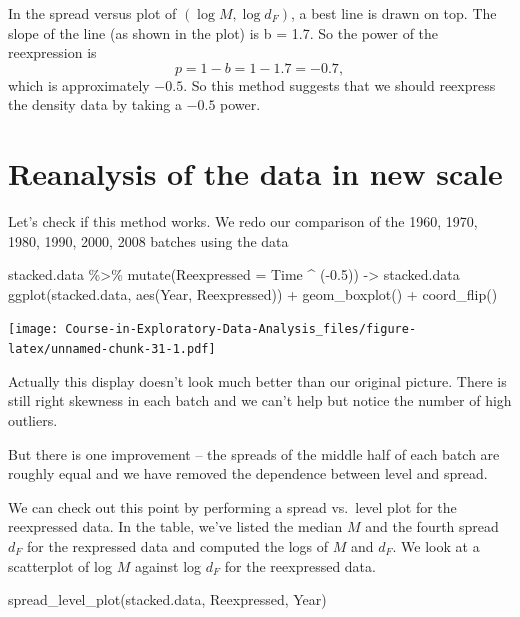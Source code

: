 \documentclass[
]{book}
\newenvironment{Shaded}{\begin{snugshade}}{\end{snugshade}}
\newcommand{\AttributeTok}[1]{\textcolor[rgb]{0.77,0.63,0.00}{#1}}
\newcommand{\FloatTok}[1]{\textcolor[rgb]{0.00,0.00,0.81}{#1}}
\newcommand{\FunctionTok}[1]{\textcolor[rgb]{0.00,0.00,0.00}{#1}}
\newcommand{\NormalTok}[1]{#1}
\newcommand{\OtherTok}[1]{\textcolor[rgb]{0.56,0.35,0.01}{#1}}
\newcommand{\SpecialCharTok}[1]{\textcolor[rgb]{0.00,0.00,0.00}{#1}}
\begin{document}
In the spread versus plot of \((\log M, \log d_F)\), a best line is drawn on top.
The slope of the line (as shown in the plot) is b = 1.7. So the power of the reexpression is
\[
p = 1 - b = 1 - 1.7 = -0.7 ,
\]
which is approximately \(-0.5\).
So this method suggests that we should reexpress the density data by taking a \(-0.5\) power.

\hypertarget{reanalysis-of-the-data-in-new-scale}{%
\section{Reanalysis of the data in new scale}\label{reanalysis-of-the-data-in-new-scale}}

Let's check if this method works. We redo our comparison of the 1960, 1970, 1980, 1990, 2000, 2008 batches using the data

\begin{Shaded}
\begin{Highlighting}[]
\NormalTok{stacked.data }\SpecialCharTok{\%\textgreater{}\%} 
  \FunctionTok{mutate}\NormalTok{(}\AttributeTok{Reexpressed =}\NormalTok{ Time }\SpecialCharTok{\^{}}\NormalTok{ (}\SpecialCharTok{{-}}\FloatTok{0.5}\NormalTok{)) }\OtherTok{{-}\textgreater{}}
\NormalTok{  stacked.data}
\FunctionTok{ggplot}\NormalTok{(stacked.data, }\FunctionTok{aes}\NormalTok{(Year, Reexpressed)) }\SpecialCharTok{+}
  \FunctionTok{geom\_boxplot}\NormalTok{() }\SpecialCharTok{+} \FunctionTok{coord\_flip}\NormalTok{()}
\end{Highlighting}
\end{Shaded}

\texttt{[image: Course-in-Exploratory-Data-Analysis\_files/figure-latex/unnamed-chunk-31-1.pdf]}

Actually this display doesn't look much better than our original picture. There is still right skewness in each batch and we can't help but notice the number of high outliers.

But there is one improvement -- the spreads of the middle half of each batch are roughly equal and we have removed the dependence between level and spread.

We can check out this point by performing a spread vs.~level plot for the reexpressed data. In the table, we've listed the median \(M\) and the fourth spread \(d_F\) for the rexpressed data and computed the logs of \(M\) and \(d_F\). We look at a scatterplot of log \(M\) against log \(d_F\) for the reexpressed data.

\begin{Shaded}
\begin{Highlighting}[]
\FunctionTok{spread\_level\_plot}\NormalTok{(stacked.data, Reexpressed, Year)}
\end{Highlighting}
\end{Shaded}
\end{document}
